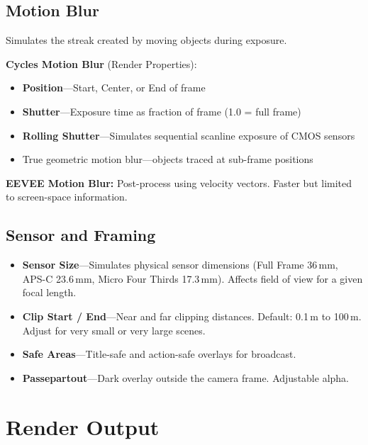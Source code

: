 \subsection{Motion Blur}

Simulates the streak created by moving objects during exposure.

\textbf{Cycles Motion Blur} (Render Properties):
\begin{itemize}[leftmargin=2em]
  \item \textbf{Position}---Start, Center, or End of frame
  \item \textbf{Shutter}---Exposure time as fraction of frame
        (1.0 = full frame)
  \item \textbf{Rolling Shutter}---Simulates sequential scanline
        exposure of CMOS sensors
  \item True geometric motion blur---objects traced at sub-frame positions
\end{itemize}

\textbf{EEVEE Motion Blur:} Post-process using velocity vectors.
Faster but limited to screen-space information.

\subsection{Sensor and Framing}

\begin{itemize}[leftmargin=2em]
  \item \textbf{Sensor Size}---Simulates physical sensor dimensions
        (Full Frame 36\,mm, APS-C 23.6\,mm, Micro Four Thirds
        17.3\,mm). Affects field of view for a given focal length.
  \item \textbf{Clip Start / End}---Near and far clipping distances.
        Default: 0.1\,m to 100\,m. Adjust for very small or very
        large scenes.
  \item \textbf{Safe Areas}---Title-safe and action-safe overlays
        for broadcast.
  \item \textbf{Passepartout}---Dark overlay outside the camera
        frame. Adjustable alpha.
\end{itemize}


\section{Render Output}
\label{sec:shading:output}

